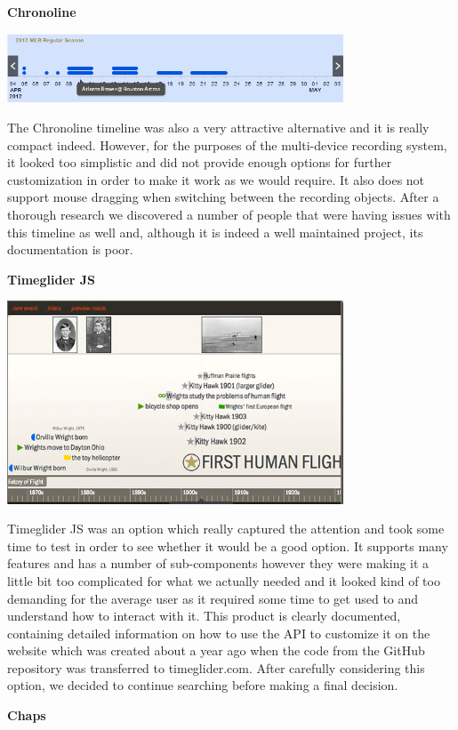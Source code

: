 \documentclass{l3proj}
\begin{document}
\textbf{Chronoline}

\includegraphics[width=0.75\textwidth]{images/Chronoline.png}

The Chronoline timeline was also a very attractive alternative and it is really compact indeed. However, for the purposes of the multi-device recording system, it looked too simplistic and did not provide enough options for further customization in order to make it work as we would require. It also does not support mouse dragging when switching between the recording objects. After a thorough research we discovered a number of people that were having issues with this timeline as well and, although it is indeed a well maintained project, its documentation is poor.


\textbf{Timeglider JS}

\includegraphics[width=0.75\textwidth]{images/Timeglider.png}

Timeglider JS was an option which really captured the attention and took some time to test in order to see whether it would be a good option. It supports many features and has a number of sub-components however they were making it a little bit too complicated for what we actually needed and it looked kind of too demanding for the average user as it required some time to get used to and understand how to interact with it. This product is clearly documented, containing detailed information on how to use the API to customize it on the website which was created about a year ago when the code from the GitHub repository was transferred to timeglider.com. After carefully considering this option, we decided to continue searching before making a final decision.


\textbf{Chaps}
\end{document}
